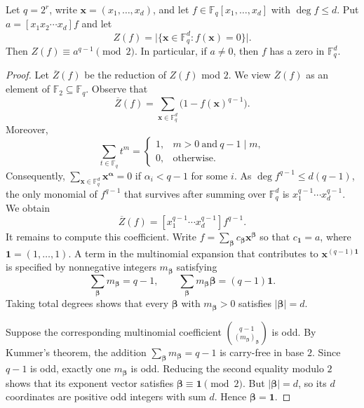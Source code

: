 \documentclass[10pt,a4paper]{amsart}
\newcommand{\F}{\mathbb{F}}
\begin{document}
\begin{lem}\label{lem:parity}
Let $q=2^r$, write $\mathbf x=(x_1,\ldots,x_d)$, and let $f\in \F_q[x_1,\ldots,x_d]$ with $\deg f\leq d$. Put $a=[x_1x_2\cdots x_d]f$ and let
\[
  Z(f)=\bigl|\{\mathbf x\in \F_q^d:f(\mathbf x)=0\}\bigr|.
\]
Then $Z(f)\equiv a^{q-1}\pmod2$. In particular, if $a\neq0$, then $f$ has a zero in $\F_q^d$.
\end{lem}

\begin{proof}
Let $\overline{Z}(f)$ be the reduction of $Z(f)$ mod $2$. We view $\overline{Z}(f)$ as an element of $\F_2\subseteq\F_q$. Observe that
\[
\overline{Z}(f)=\sum_{\mathbf x\in\mathbb F_q^d}\bigl(1-f(\mathbf x)^{q-1}\bigr).
\]
Moreover,
\[
\sum_{t\in\mathbb F_q}t^m=
\begin{cases}
1,& m>0\ \text{and}\ q-1\mid m,\\
0,&\text{otherwise}.
\end{cases}
\]
Consequently, $\sum_{\mathbf{x}\in\F_q^{d}} \mathbf{x}^{\boldsymbol{\alpha}}=0$ if $\alpha_i<q-1$ for some $i$. As $\deg f^{q-1}\le d(q-1)$, the only monomial of $f^{q-1}$ that
survives after summing over $\mathbb F_q^d$ is
$x_1^{q-1}\cdots x_d^{q-1}$. We obtain
\begin{equation}\label{eq:Z(f)}
\overline{Z}(f)=[x_1^{q-1}\cdots x_d^{q-1}]f^{q-1}.
\end{equation}
It remains to compute this coefficient. Write $f=\sum_{\boldsymbol{\beta}} c_{\boldsymbol{\beta}}\mathbf{x}^{\boldsymbol{\beta}}$ so that $c_{\mathbf 1}=a$, where $\mathbf{1}=(1,\ldots,1)$. A term in the multinomial expansion that
contributes to $\mathbf x^{(q-1)\mathbf1}$ is specified by
nonnegative integers $m_{\boldsymbol\beta}$ satisfying
\[
\sum_{\boldsymbol{\beta}} m_{\boldsymbol{\beta}}=q-1,
\qquad
\sum_{\boldsymbol{\beta}} m_{\boldsymbol{\beta}}\boldsymbol{\beta}=(q-1)\mathbf 1.
\]
Taking total degrees shows that every $\boldsymbol{\beta}$ with $m_{\boldsymbol{\beta}}>0$ satisfies $|\boldsymbol{\beta}|=d$.

Suppose the corresponding multinomial coefficient $\binom{q-1}{(m_{\boldsymbol{\beta}})_{\boldsymbol{\beta}}}$ is odd. By Kummer's theorem, the 
addition $\sum_{\boldsymbol{\beta}}m_{\boldsymbol{\beta}}=q-1$ is carry-free in base $2$. Since \(q-1\) is odd,
exactly one \(m_{\boldsymbol{\beta}}\) is odd. Reducing the second equality modulo \(2\)
shows that its exponent vector satisfies
$\boldsymbol{\beta}\equiv\mathbf 1\pmod 2$. 
But \(|\boldsymbol{\beta}|=d\), so its \(d\) coordinates are positive odd integers with
sum \(d\). Hence \(\boldsymbol{\beta}=\mathbf 1\).


\end{proof}
\end{document}
